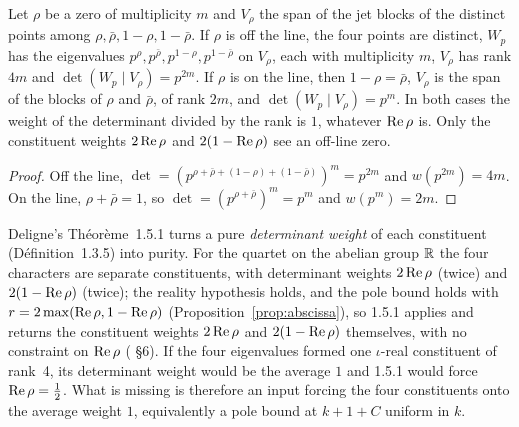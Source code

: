 \begin{proposition}\label{prop:avgweight}
Let $\rho$ be a zero of multiplicity $m$ and $V_\rho$ the span of the jet blocks of the distinct points among $\rho,\bar\rho,1-\rho,1-\bar\rho$. If $\rho$ is off the line, the four points are distinct, $W_p$ has the eigenvalues $p^\rho,p^{\bar\rho},p^{1-\rho},p^{1-\bar\rho}$ on $V_\rho$, each with multiplicity $m$, $V_\rho$ has rank $4m$ and $\det(W_p\mid V_\rho)=p^{2m}$. If $\rho$ is on the line, then $1-\rho=\bar\rho$, $V_\rho$ is the span of the blocks of $\rho$ and $\bar\rho$, of rank $2m$, and $\det(W_p\mid V_\rho)=p^{m}$. In both cases the weight of the determinant divided by the rank is $1$, whatever $\operatorname{Re}\rho$ is. Only the constituent weights $2\operatorname{Re}\rho$ and $2(1-\operatorname{Re}\rho)$ see an off-line zero.
\end{proposition}

\begin{proof}
Off the line, $\det=(p^{\rho+\bar\rho+(1-\rho)+(1-\bar\rho)})^m=p^{2m}$ and $w(p^{2m})=4m$. On the line, $\rho+\bar\rho=1$, so $\det=(p^{\rho+\bar\rho})^m=p^m$ and $w(p^m)=2m$.
\end{proof}

Deligne's Théorème~1.5.1 turns a pure \emph{determinant weight} of each constituent (Définition~1.3.5) into purity. For the quartet on the abelian group $\mathbb{R}$ the four characters are separate constituents, with determinant weights $2\operatorname{Re}\rho$ (twice) and $2(1-\operatorname{Re}\rho)$ (twice); the reality hypothesis holds, and the pole bound holds with $r=2\max(\operatorname{Re}\rho,1-\operatorname{Re}\rho)$ (Proposition~\ref{prop:abscissa}), so 1.5.1 applies and returns the constituent weights $2\operatorname{Re}\rho$ and $2(1-\operatorname{Re}\rho)$ themselves, with no constraint on $\operatorname{Re}\rho$ ( §6). If the four eigenvalues formed one $\iota$-real constituent of rank~4, its determinant weight would be the average $1$ and 1.5.1 would force $\operatorname{Re}\rho=\tfrac12$. What is missing is therefore an input forcing the four constituents onto the average weight $1$, equivalently a pole bound at $k+1+C$ uniform in $k$.

